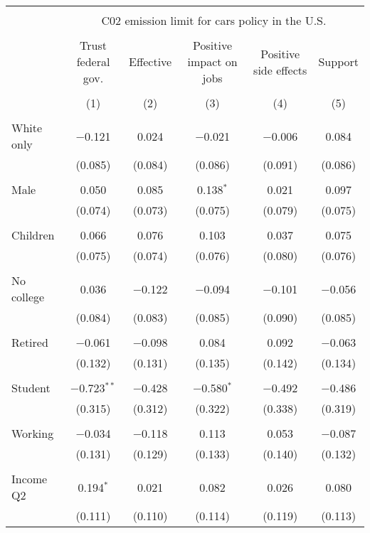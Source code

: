 
\begin{tabular}{@{\extracolsep{5pt}}lccccc} 
\\[-1.8ex]\hline 
\hline \\[-1.8ex] 
 & \multicolumn{5}{c}{C02 emission limit for cars policy in the U.S.} \\ 
\cline{2-6} 
\\[-1.8ex] & Trust federal gov. & Effective & Positive impact on jobs & Positive side effects & Support \\ 
\\[-1.8ex] & (1) & (2) & (3) & (4) & (5)\\ 
\hline \\[-1.8ex] 
 White only & $-$0.121 & 0.024 & $-$0.021 & $-$0.006 & 0.084 \\ 
  & (0.085) & (0.084) & (0.086) & (0.091) & (0.086) \\ 
  & & & & & \\ 
 Male & 0.050 & 0.085 & 0.138$^{*}$ & 0.021 & 0.097 \\ 
  & (0.074) & (0.073) & (0.075) & (0.079) & (0.075) \\ 
  & & & & & \\ 
 Children & 0.066 & 0.076 & 0.103 & 0.037 & 0.075 \\ 
  & (0.075) & (0.074) & (0.076) & (0.080) & (0.076) \\ 
  & & & & & \\ 
 No college & 0.036 & $-$0.122 & $-$0.094 & $-$0.101 & $-$0.056 \\ 
  & (0.084) & (0.083) & (0.085) & (0.090) & (0.085) \\ 
  & & & & & \\ 
 Retired & $-$0.061 & $-$0.098 & 0.084 & 0.092 & $-$0.063 \\ 
  & (0.132) & (0.131) & (0.135) & (0.142) & (0.134) \\ 
  & & & & & \\ 
 Student & $-$0.723$^{**}$ & $-$0.428 & $-$0.580$^{*}$ & $-$0.492 & $-$0.486 \\ 
  & (0.315) & (0.312) & (0.322) & (0.338) & (0.319) \\ 
  & & & & & \\ 
 Working & $-$0.034 & $-$0.118 & 0.113 & 0.053 & $-$0.087 \\ 
  & (0.131) & (0.129) & (0.133) & (0.140) & (0.132) \\ 
  & & & & & \\ 
 Income Q2 & 0.194$^{*}$ & 0.021 & 0.082 & 0.026 & 0.080 \\ 
  & (0.111) & (0.110) & (0.114) & (0.119) & (0.113) \\ 

\end{tabular}
